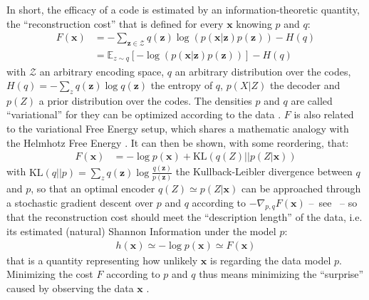 \documentclass[12pt,twoside,openright]{article}
\begin{document}
In short, the efficacy of a code is estimated by an information-theoretic quantity, the ``reconstruction cost'' that is defined for every $\boldsymbol{x}$ knowing $p$ and $q$:
\begin{align}
F(\boldsymbol{x}) &= - \sum_{\boldsymbol{z} \in \mathcal{Z}} q(\boldsymbol{z}) \log (p(\boldsymbol{x}|\boldsymbol{z})p(\boldsymbol{z})) - H(q)\nonumber\\
&= \mathbb{E}_{z\sim q} \left[-\log (p(\boldsymbol{x}|\boldsymbol{z})p(\boldsymbol{z}))\right] - H(q)
\label{eq:FEP-energy}
\end{align}
with $\mathcal{Z}$ an arbitrary encoding space, $q$ an arbitrary distribution over the codes, $H(q) = -\sum_z q(\boldsymbol{z}) \log q(\boldsymbol{z})$ the entropy of $q$, $p(X|Z)$ the decoder and $p(Z)$ a prior distribution over the codes.
The densities $p$ and $q$ are called ``variational'' for they can be optimized according to the data \cite{hinton2006fast,kingma2013auto}.  
$F$ is also related to the variational Free Energy setup, which shares a mathematic analogy with the Helmhotz Free Energy \cite{friston2010free}.
It can then be shown, with some reordering, that:
\begin{align}
F(\boldsymbol{x}) 
&= - \log p(\boldsymbol{x}) + \text{KL}(q(Z)||p(Z|\boldsymbol{x}))
\label{eq:FEP}
\end{align}
with $\text{KL}(q||p) = \sum_z q(\boldsymbol{z}) \log \frac{q(\boldsymbol{z})}{p(\boldsymbol{z})}$ the Kullback-Leibler divergence between $q$ and $p$, so that an optimal encoder $q(Z)\simeq p(Z|\boldsymbol{x})$ can be approached through a stochastic gradient descent over $p$ and $q$ according to $-\nabla_{p,q} F(\boldsymbol{x}) $	 --~see \cite{kingma2013auto}~-- so that the reconstruction cost should meet the ``description length'' of the data, i.e. its estimated (natural) Shannon Information under the model $p$:
\begin{align*}
h(\boldsymbol{x}) \simeq -\log p(\boldsymbol{x}) \simeq  F(\boldsymbol{x})%
\end{align*}
that is a quantity representing how unlikely $\boldsymbol{x}$ is regarding the data model $p$. Minimizing the cost $F$ according to $p$ and $q$ thus means minimizing the ``surprise'' caused by observing the data $\boldsymbol{x}$ \cite{friston2010free}.


\end{document}
